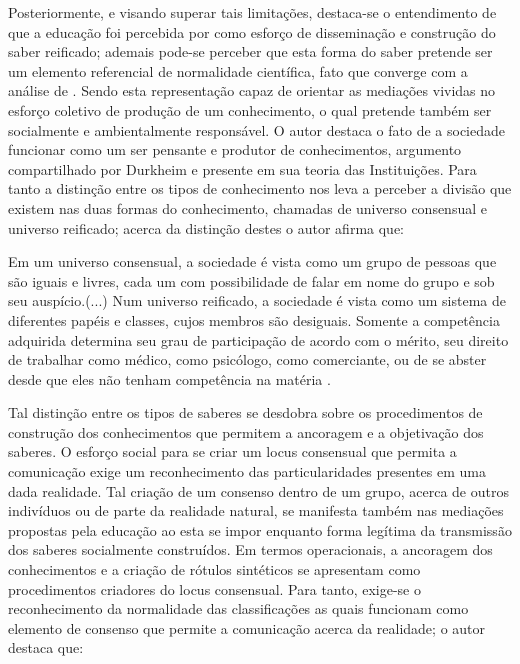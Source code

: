 \documentclass[
  12pt,       %
  openright,      %
  twoside,      %
  a4paper,      %
  english,      %
  french,       %
  spanish,      %
  brazil        %
  ]{abntex2}
\begin{document}
Posteriormente, e visando superar tais limitações, destaca-se o entendimento de que a educação foi percebida por  como esforço de disseminação e construção do saber reificado; ademais pode-se perceber que esta forma do saber pretende ser um elemento referencial de normalidade científica, fato que converge com a análise de . Sendo esta representação capaz de orientar as mediações vividas no esforço coletivo de produção de um conhecimento, o qual pretende também ser socialmente e ambientalmente responsável. O autor destaca o fato de a sociedade funcionar como um ser pensante e produtor de conhecimentos, argumento compartilhado por Durkheim e presente em sua teoria das Instituições. Para tanto a distinção entre os tipos de conhecimento nos leva a perceber a divisão que existem nas duas formas do conhecimento, chamadas de universo consensual e universo reificado; acerca da distinção destes o autor afirma que:

\begin{citacao}
Em um universo consensual, a sociedade
é vista como um grupo de pessoas que são iguais e livres, cada um
com possibilidade de falar em nome do grupo e sob seu auspício.(...)
Num universo reificado, a sociedade é vista como um sistema
de diferentes papéis e classes, cujos membros são desiguais. 
Somente a competência adquirida determina seu grau de participação
de acordo com o mérito, seu direito de trabalhar como médico, 
como psicólogo, como comerciante, ou de se abster desde
que eles não tenham competência na matéria \cite[p.50-51]{Representacees_sociais_moscovici}.
\end{citacao}


Tal distinção entre os tipos de saberes se desdobra sobre os procedimentos de construção dos conhecimentos que permitem a ancoragem e a objetivação dos saberes. O esforço social para se criar um locus consensual que permita a comunicação exige um reconhecimento das particularidades presentes em uma dada realidade. Tal criação de um consenso dentro de um grupo, acerca de outros indivíduos ou de parte da realidade natural, se manifesta também nas mediações propostas pela educação ao esta se impor enquanto forma legítima da transmissão dos saberes socialmente construídos. Em termos operacionais, a ancoragem dos conhecimentos e a criação de rótulos sintéticos se apresentam como procedimentos criadores do locus consensual. Para tanto, exige-se o reconhecimento da normalidade das classificações as quais funcionam como elemento de consenso que permite a comunicação acerca da realidade; o autor destaca que:
\end{document}
